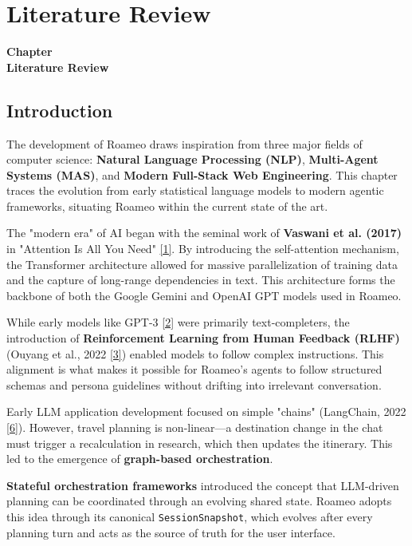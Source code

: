 \documentclass[12pt,a4paper]{report}
\newcommand{\chapcite}[1]{\hyperlink{ref:#1}{[#1]}}
\newcommand{\chapcitetarget}[1]{\hypertarget{cite:#1}{}\chapcite{#1}}
\newcommand{\chaptercontentheading}[1]{%
  \thispagestyle{mainstyle}%
  \begin{center}
    {\Large\bfseries Chapter~\thechapter}\\[0.35cm]
    {\Large\bfseries #1}
  \end{center}
  \vspace{0.9cm}
}
\begin{document}
\chapter{Literature Review}
\chaptercontentheading{Literature Review}

\section{Introduction}

The development of Roameo draws inspiration from three major fields of computer science: \textbf{Natural Language Processing (NLP)}, \textbf{Multi-Agent Systems (MAS)}, and \textbf{Modern Full-Stack Web Engineering}. This chapter traces the evolution from early statistical language models to modern agentic frameworks, situating Roameo within the current state of the art.

The "modern era" of AI began with the seminal work of \textbf{Vaswani et al. (2017)} in "Attention Is All You Need" \chapcitetarget{1}. By introducing the self-attention mechanism, the Transformer architecture allowed for massive parallelization of training data and the capture of long-range dependencies in text. This architecture forms the backbone of both the Google Gemini and OpenAI GPT models used in Roameo.

While early models like GPT-3 \chapcitetarget{2} were primarily text-completers, the introduction of \textbf{Reinforcement Learning from Human Feedback (RLHF)} (Ouyang et al., 2022 \chapcitetarget{3}) enabled models to follow complex instructions. This alignment is what makes it possible for Roameo's agents to follow structured schemas and persona guidelines without drifting into irrelevant conversation.

Early LLM application development focused on simple "chains" (LangChain, 2022 \chapcitetarget{6}). However, travel planning is non-linear---a destination change in the chat must trigger a recalculation in research, which then updates the itinerary. This led to the emergence of \textbf{graph-based orchestration}. 

\textbf{Stateful orchestration frameworks} introduced the concept that LLM-driven planning can be coordinated through an evolving shared state. Roameo adopts this idea through its canonical \texttt{SessionSnapshot}, which evolves after every planning turn and acts as the source of truth for the user interface.
\end{document}
